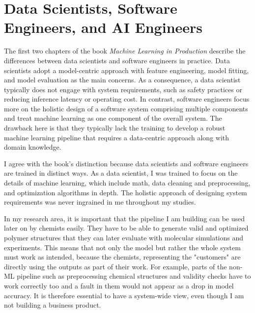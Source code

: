 \documentclass[11pt,a4paper]{article}
\begin{document}
\section{Data Scientists, Software Engineers, and AI Engineers}

The first two chapters of the book \emph{Machine Learning in Production} \citep{ml_production} describe the differences between data scientists and software engineers in practice. Data scientists adopt a model-centric approach with feature engineering, model fitting, and model evaluation as the main concerns. As a consequence, a data scientist typically does not engage with system requirements, such as safety practices or reducing inference latency or operating cost. In contrast, software engineers focus more on the holistic design of a software system comprising multiple components and treat machine learning as one component of the overall system. The drawback here is that they typically lack the training to develop a robust machine learning pipeline that requires a data-centric approach along with domain knowledge. 


I agree with the book's distinction because data scientists and software engineers are trained in distinct ways. As a data scientist, I was trained to focus on the details of machine learning, which include math, data cleaning and preprocessing, and optimization algorithms in depth. The holistic approach of designing system requirements was never ingrained in me throughout my studies. 


In my research area, it is important that the pipeline I am building can be used later on by chemists easily. They have to be able to generate valid and optimized polymer structures that they can later evaluate with molecular simulations and experiments. This means that not only the model but rather the whole system must work as intended, because the chemists, representing the "customers" are directly using the outputs as part of their work. For example, parts of the non-ML pipeline such as preprocessing chemical structures and validity checks have to work correctly too and a fault in them would not appear as a drop in model accuracy. It is therefore essential to have a system-wide view, even though I am not building a business product.
\end{document}

